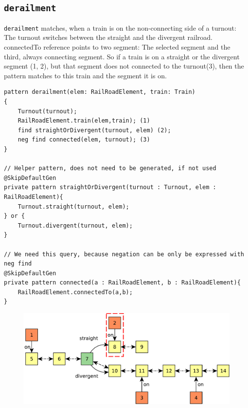 \subsection{\texttt{derailment}}
\begin{minipage}{\textwidth}
	
\texttt{derailment} matches, when a train is on the non-connecting side of a turnout:
The turnout switches between the straight and the divergent railroad. 
connectedTo reference points to two segment: The selected segment and the third, always connecting segment.
So if a train is on a straight or the divergent segment (1, 2), but that segment does not connected to the turnout(3), then the pattern matches to this train and the segment it is on.


\begin{lstlisting}[language = vql]
pattern derailment(elem: RailRoadElement, train: Train)
{
	Turnout(turnout);
	RailRoadElement.train(elem,train); (1)
	find straightOrDivergent(turnout, elem) (2);
	neg find connected(elem, turnout); (3)
}

// Helper pattern, does not need to be generated, if not used
@SkipDefaultGen
private pattern straightOrDivergent(turnout : Turnout, elem : RailRoadElement){
	Turnout.straight(turnout, elem);
} or {
	Turnout.divergent(turnout, elem);
}

// We need this query, because negation can be only be expressed with neg find
@SkipDefaultGen
private pattern connected(a : RailRoadElement, b : RailRoadElement){
	RailRoadElement.connectedTo(a,b);
}

\end{lstlisting}

\begin{figure}[H]
	\begin{center}
		\includegraphics[width=\textwidth]{figures/query-example-model-derailment.pdf}
	\end{center}
\end{figure}


\end{minipage}
\vspace{\belowdisplayskip}







